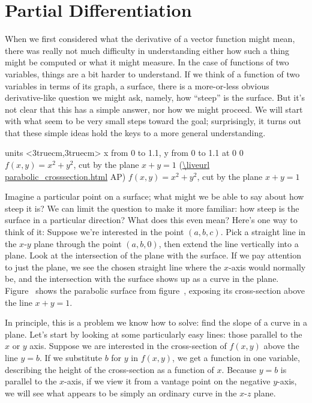\section{Partial Differentiation}{}{}

When we first considered what the derivative of a vector function
might mean, there was really not much difficulty in understanding
either how such a thing might be computed or what it might measure. In
the case of functions of two variables, things are a bit harder to
understand. If we think of a function of two variables in terms of its
graph, a surface, there is a more-or-less obvious derivative-like
question we might ask, namely, how ``steep'' is the surface. But it's
not clear that this has a simple answer, nor how we might proceed. We
will start with what seem to be very small steps toward the goal;
surprisingly, it turns out that these simple ideas hold the keys to a
more general understanding.

\figure
\texonly
\vbox{\beginpicture
\normalgraphs
\ninepoint
\setcoordinatesystem units <3truecm,3truecm>
\setplotarea x from 0 to 1.1, y from 0 to 1.1
 at 0 0
\endpicture}
\begincaption
$f(x,y)=x^2 + y^2$, cut by the plane $x+y=1$
(\expandafter\url\expandafter{\liveurl parabolic_crosssection.html}%
AP\endurl)
\endcaption
\endtexonly
{}
\htmlonly
\begincaption
$f(x,y)=x^2 + y^2$, cut by the plane $x+y=1$
\endcaption
\endhtmlonly
\endfigure

Imagine a particular point on a surface; what might we be able to say
about how steep it is? We can limit the question to make it more
familiar: how steep is the surface in a particular direction? What
does this even mean? Here's one way to think of it: Suppose we're
interested in the point $(a,b,c)$. Pick a straight line in the $x$-$y$
plane through the point $(a,b,0)$, then extend the line vertically
into a plane. Look at the intersection of the plane with the surface.
If we pay attention to just the plane, we see the chosen straight line
where the $x$-axis would normally be, and the intersection with the
surface shows up as a curve in the plane. Figure~ shows the parabolic surface from
figure~, exposing its cross-section above
the line $x+y=1$.

In principle, this is a problem we know how to solve: find the slope
of a curve in a plane. Let's start by looking at some particularly
easy lines: those parallel to the $x$ or $y$ axis. Suppose we are
interested in the cross-section of $f(x,y)$ above the line $y=b$. If
we substitute $b$ for $y$ in $f(x,y)$, we get a function in one
variable, describing the height of the cross-section as a function of
$x$. Because $y=b$ is parallel to the $x$-axis, if we view it from a
vantage point on the negative $y$-axis, we will see what appears to be
simply an ordinary curve in the $x$-$z$ plane.

